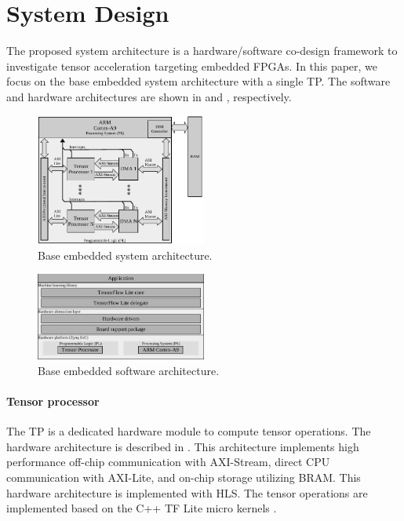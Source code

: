 \section{System Design}
\label{sec:system_design}
The proposed system architecture is a hardware/software co-design framework to investigate tensor acceleration targeting embedded FPGAs. In this paper, we focus on the base embedded system architecture with a single TP. The software and hardware architectures are shown in  and , respectively.

\begin{figure}[t!]
	\centering
	\includegraphics[width=0.5\textwidth]{../figures/system_design.pdf}
	\caption{Base embedded system architecture.}
	\label{fig:system_architecture}
\end{figure}

\begin{figure}[t!]
	\centering
	\includegraphics[width=0.5\textwidth]{../figures/sw_stack.pdf}
	\caption{Base embedded software architecture.}
	\label{fig:sw_stack}
\end{figure}

\paragraph{\textbf{Tensor processor}}
The TP is a dedicated hardware module to compute tensor operations. The hardware architecture is described in . This architecture implements high performance off-chip communication with AXI-Stream, direct CPU communication with AXI-Lite, and on-chip storage utilizing BRAM. This hardware architecture is implemented with HLS. The tensor operations are implemented based on the C++ TF Lite micro kernels \cite{tfLiteMicro}.


